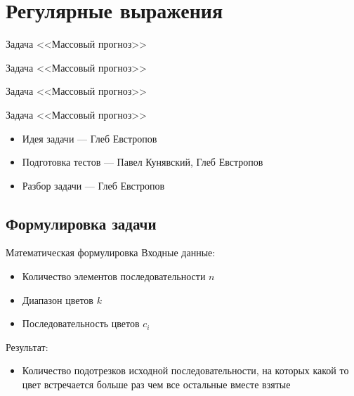 \section{Регулярные выражения}

\begin{frame}[t]{Задача <<Массовый прогноз>>}

  \begin{center}
    \LARGE Задача <<Массовый прогноз>>
  \end{center}

\end{frame}

\begin{frame}[t]{Задача <<Массовый прогноз>>}

  \begin{center}
    \LARGE Задача <<Массовый прогноз>>
  \end{center}

  \begin{itemize}
    \item Идея задачи --- Глеб Евстропов
    \item Подготовка тестов --- Павел Кунявский, Глеб Евстропов
    \item Разбор задачи --- Глеб Евстропов
  \end{itemize}
\end{frame}

\subsection{Формулировка задачи}

\begin{frame}[t]{Математическая формулировка}
  Входные данные:
  \begin{itemize}
    \item Количество элементов последовательности $n$
    \item Диапазон цветов $k$
    \item Последовательность цветов $c_i$
  \end{itemize}
  Результат:
  \begin{itemize}
    \item Количество подотрезков исходной последовательности, на которых какой то цвет встречается больше раз чем все остальные вместе взятые
  \end{itemize}
\end{frame}

